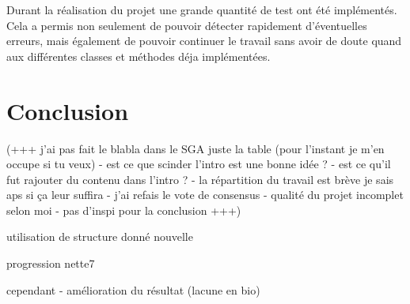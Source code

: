 \documentclass{article}
\begin{document}
Durant la réalisation du projet une grande quantité de test ont été implémentés. Cela a permis non seulement de pouvoir détecter rapidement d'éventuelles erreurs, mais également de pouvoir continuer le travail sans avoir de doute quand aux différentes classes et méthodes déja implémentées.



\section{Conclusion}

(+++ j'ai pas fait le blabla dans le SGA juste la table (pour l'instant je m'en occupe si tu veux)  - est ce que scinder l'intro est une bonne idée ? - est ce qu'il fut rajouter du contenu dans l'intro ? -  la répartition du travail est brève je sais aps si ça leur suffira -  j'ai refais le vote de consensus -  qualité du projet incomplet selon moi - pas d'inspi pour la conclusion +++)

utilisation de structure donné nouvelle

progression nette7

cependant - amélioration du résultat (lacune en bio)
\end{document}
